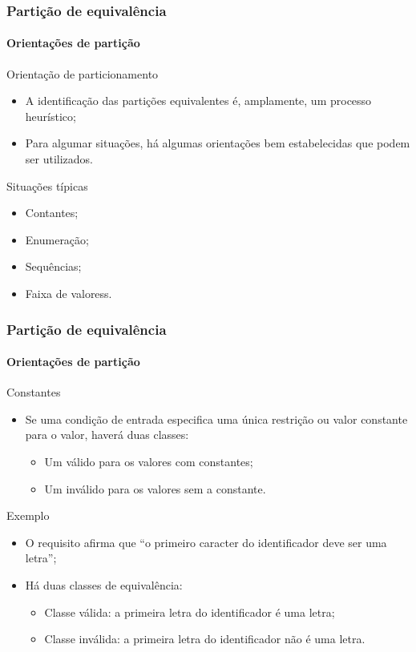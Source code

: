 \begin{frame}
\frametitle{Partição de equivalência}
\framesubtitle{Orientações de partição}

\begin{block:fact}{Orientação de particionamento}
\begin{itemize}
	\item A identificação das partições equivalentes é, amplamente, um
	processo heurístico;

	\item Para algumar situações, há algumas orientações bem estabelecidas
	que podem ser utilizados.
\end{itemize}
\end{block:fact}

\begin{block:fact}{Situações típicas}
\begin{itemize}
	\item Contantes;
	\item Enumeração;
	\item Sequências;
	\item Faixa de valoress.
\end{itemize}
\end{block:fact}
\end{frame}


\begin{frame}
\frametitle{Partição de equivalência}
\framesubtitle{Orientações de partição}

\begin{block:fact}{Constantes}
\begin{itemize}
	\item Se uma condição de entrada especifica uma única restrição ou valor
	constante para o valor, haverá duas classes:
	\begin{itemize}
		\item Um válido para os valores com constantes;
		\item Um inválido para os valores sem a constante.
	\end{itemize}
\end{itemize}
\end{block:fact}

\begin{block}{Exemplo}
\begin{itemize}
	\item O requisito afirma que ``o primeiro caracter do identificador
	deve ser uma letra'';

	\item Há duas classes de equivalência:
	\begin{itemize}
		\item Classe válida: a primeira letra do identificador é uma letra;
		\item Classe inválida: a primeira letra do identificador não é uma letra.
	\end{itemize}
\end{itemize}
\end{block}
\end{frame}



